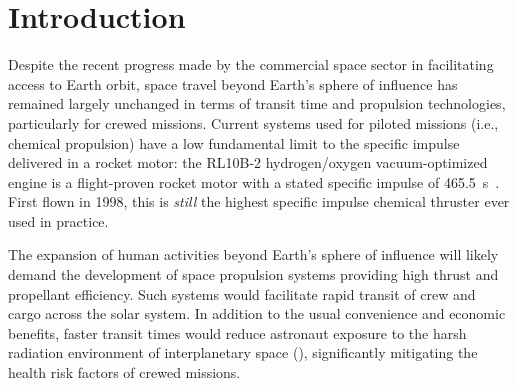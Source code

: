 \chapter{Introduction} \label{chp:intro}
    Despite the recent progress made by the commercial space sector in facilitating access to Earth orbit, space travel beyond Earth's sphere of influence has remained largely unchanged in terms of transit time and propulsion technologies, particularly for crewed missions. Current systems used for piloted missions (i.e., chemical propulsion) have a low fundamental limit to the specific impulse delivered in a rocket motor: the RL10B-2 hydrogen/oxygen vacuum-optimized engine is a flight-proven rocket motor with a stated specific impulse of \qty{465.5}{s}~\cite{l3harrisRL10Engine2023}. First flown in 1998, this is \emph{still} the highest specific impulse chemical thruster ever used in practice.
    
    The expansion of human activities beyond Earth's sphere of influence will likely demand the development of space propulsion systems providing high thrust and propellant efficiency. Such systems would facilitate rapid transit of crew and cargo across the solar system. In addition to the usual convenience and economic benefits, faster transit times would reduce astronaut exposure to the harsh radiation environment of interplanetary space (\textcite{bergerLongTermVariations2020}), significantly mitigating the health risk factors of crewed missions.

